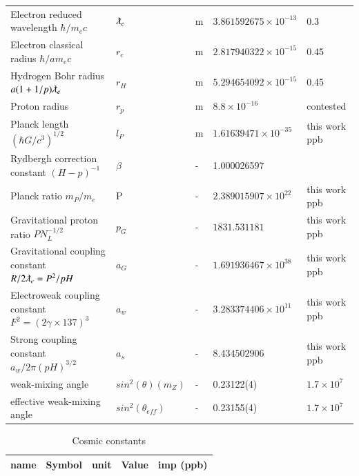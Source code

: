 \documentclass[a4paper,9pt]{article}
\begin{document}
\begin{appendix}
\begin{table}
\begin{tabular}{lllll}
 Electron reduced wavelength $\hbar/m_ec$ & $\lambdabar_e$ &  m   & $3.861592675\times 10^{-13}$  & 0.3\\
 Electron classical radius $\hbar/am_ec$ & $r_e$ &  m   & $2.817940322\times 10^{-15}$  & 0.45\\
 Hydrogen Bohr radius $a(1+1/p)\lambdabar_e$ & $r_H$ &  m   & $5.294654092 \times 10^{-15}$  & 0.45\\
 Proton radius  & $r_p$ &  m   & $8.8\times 10^{-16}$  & contested\\
 Planck length $(\hbar G /c^3)^{1/2}$ & $l_P$  & m  & $1.61639471 \times 10^{-35}$ & this work ppb  \\
 Rydbergh correction constant $(H-p)^{-1}$ & $\beta$  & -  & 1.000026597 &   \\
 Planck ratio $m_P/m_e$ & P  & -  & $2.389015907 \times 10^{22}$ & this work ppb  \\
 Gravitational proton ratio $P N_L^{-1/2}$ & $p_G$  & -  & $ 1831.531181 $ & this work ppb  \\
 Gravitational coupling constant $R/2\lambdabar_e = P^2/pH$ & $a_G$   & -  & $1.691936467 \times 10^{38}$ & this work ppb  \\
 Electroweak coupling constant $F^2 = (2\gamma\times 137)^3$ & $a_w$   & -  & $3.283374406 \times 10^{11}$ & this work ppb  \\
 Strong coupling constant $a_w/2\pi(pH)^{3/2}$ & $a_s$   & -  & $8.434502906$ & this work ppb  \\
 weak-mixing angle & $sin^2(\theta)(m_Z)$   & -  & 0.23122(4) & $1.7 \times 10^7$  \\
 effective weak-mixing angle & $sin^2(\theta_{eff})$   & -  & 0.23155(4) & $1.7 \times 10^7$  \\    
    \bottomrule
  \end{tabular}
\end{table}

\begin{table}
\caption{Cosmic constants}
\label{tab:3:table3}
  \hskip-2.0cm\begin{tabular}{lllll}
    \toprule
      \cmidrule(r){1-5}
     name & Symbol   & unit   & Value & imp (ppb) \\
 \midrule
       

\end{tabular}
\end{table}
\end{appendix}
\end{document}

